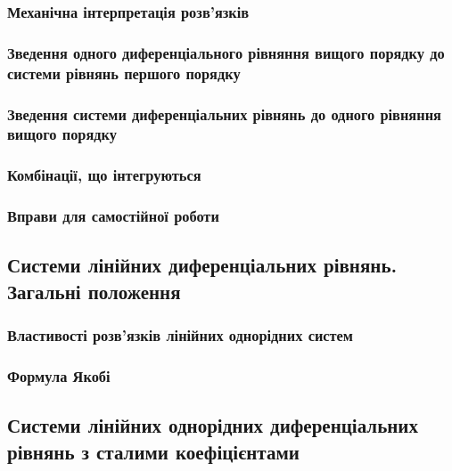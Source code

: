 		\subsubsection{Механічна інтерпретація розв'язків}
		

		\subsubsection{Зведення одного диференціального рівняння вищого порядку до системи рівнянь першого порядку}
		

		\subsubsection{Зведення системи диференціальних рівнянь до одного рівняння вищого порядку}
		

		\subsubsection{Комбінації, що інтегруються}
		

		\subsubsection{Вправи для самостійної роботи}
		

	\subsection{Системи лінійних диференціальних рівнянь. Загальні положення}
	

		\subsubsection{Властивості розв'язків лінійних однорідних систем}
		

		\subsubsection{Формула Якобі}
		

	\subsection{Системи лінійних однорідних диференціальних рівнянь з сталими коефіцієнтами}
	

